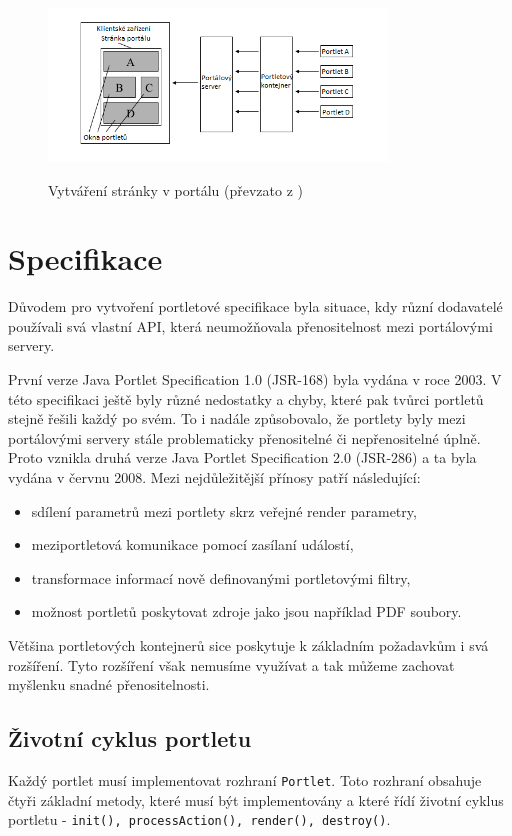 \documentclass{fithesis}
\begin{document}
\begin{figure}[htp]
\centering
\includegraphics[width=340px]{images/vytvareni_stranky_v_portalu.png}
\label{fig:vytvareni_stranky}
\caption{Vytváření stránky v portálu (převzato z \cite{jsr-286})}
\end{figure}

\section{Specifikace}
Důvodem pro vytvoření portletové specifikace byla situace, kdy různí dodavatelé používali svá vlastní API, která neumožňovala přenositelnost mezi portálovými servery.

První verze Java Portlet Specification 1.0 (JSR-168) byla vydána v roce 2003. V této specifikaci ještě byly různé nedostatky a chyby, které pak tvůrci portletů stejně řešili každý po svém. To i nadále způsobovalo, že portlety byly mezi portálovými servery stále problematicky přenositelné či nepřenositelné úplně. Proto vznikla druhá verze Java Portlet Specification 2.0 (JSR-286) a ta byla vydána v červnu 2008. Mezi nejdůležitější přínosy patří následující:
\begin{itemize}
\item sdílení parametrů mezi portlety skrz veřejné render parametry,
\item meziportletová komunikace pomocí zasílaní událostí,
\item transformace informací nově definovanými portletovými filtry,
\item možnost portletů poskytovat zdroje jako jsou například PDF soubory.
\end{itemize}
Většina portletových kontejnerů sice poskytuje k základním požadavkům i svá rozšíření. Tyto rozšíření však nemusíme využívat a tak můžeme zachovat myšlenku snadné přenositelnosti.

\subsection{Životní cyklus portletu}
Každý portlet musí implementovat rozhraní \verb|Portlet|. Toto rozhraní obsahuje čtyři základní metody, které musí být implementovány a které řídí životní cyklus portletu - \verb|init(), processAction(), render(), destroy()|.
\end{document}
